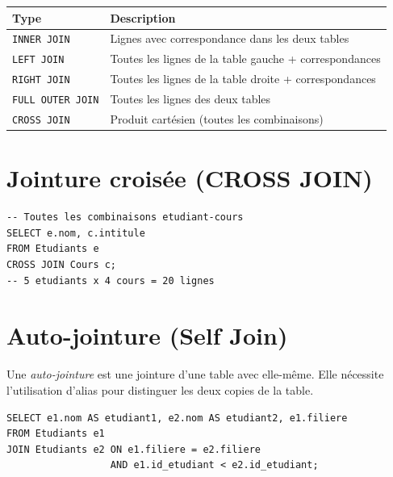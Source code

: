\begin{formules}[title=\textbf{R\'esum\'e des types de jointures}]
\begin{center}
\begin{tabular}{lp{8cm}}
\toprule
\textbf{Type} & \textbf{Description} \\
\midrule
\texttt{INNER JOIN} & Lignes avec correspondance dans les deux tables \\
\texttt{LEFT JOIN} & Toutes les lignes de la table gauche + correspondances \\
\texttt{RIGHT JOIN} & Toutes les lignes de la table droite + correspondances \\
\texttt{FULL OUTER JOIN} & Toutes les lignes des deux tables \\
\texttt{CROSS JOIN} & Produit cart\'esien (toutes les combinaisons) \\
\bottomrule
\end{tabular}
\end{center}
\end{formules}

\section{Jointure crois\'ee (CROSS JOIN)}

\begin{codeblock}[title=\textbf{Produit cart\'esien}]
\begin{verbatim}
-- Toutes les combinaisons etudiant-cours
SELECT e.nom, c.intitule
FROM Etudiants e
CROSS JOIN Cours c;
-- 5 etudiants x 4 cours = 20 lignes
\end{verbatim}
\end{codeblock}

\section{Auto-jointure (Self Join)}

\begin{definition}
Une \emph{auto-jointure} est une jointure d'une table avec elle-m\^eme.
Elle n\'ecessite l'utilisation d'alias pour distinguer les deux
\og copies \fg de la table.
\end{definition}

\begin{codeblock}[title=\textbf{Trouver les paires d'\'etudiants de la m\^eme fili\`ere}]
\begin{verbatim}
SELECT e1.nom AS etudiant1, e2.nom AS etudiant2, e1.filiere
FROM Etudiants e1
JOIN Etudiants e2 ON e1.filiere = e2.filiere
                  AND e1.id_etudiant < e2.id_etudiant;
\end{verbatim}
\end{codeblock}


